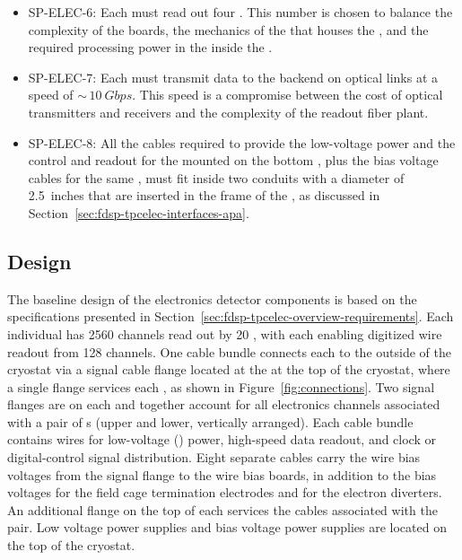 \begin{itemize}
\item SP-ELEC-6: Each  must read out four . This number
is chosen to balance the complexity of the boards, the mechanics
of the  that houses the , and the 
required processing power in the  inside the
.

\item SP-ELEC-7: Each  must transmit data to the 
backend on optical links at a speed of $\sim\,\SI{10}{Gbps}$. This speed 
is a compromise between the cost of optical transmitters and
receivers and the complexity of the readout fiber plant.

\item SP-ELEC-8: All the cables required to provide the low-voltage power
and the control and readout for the  mounted on
the bottom , plus the bias voltage cables for
the same , must fit inside two conduits with a
diameter of \SI{2.5}{inches} that are inserted in the frame of
the , as discussed in Section~\ref{sec:fdsp-tpcelec-interfaces-apa}. 
\end{itemize}

\subsection{Design}
\label{sec:fdsp-tpcelec-overview-design}

The baseline design of the  electronics detector components is
based on the specifications presented in Section~\ref{sec:fdsp-tpcelec-overview-requirements}. 
Each individual  has \num{2560} channels read out by \num{20} 
, with each  enabling digitized wire readout 
from \num{128} channels. One cable bundle connects each  to
the outside of the cryostat via a  signal cable flange located 
at the  \fdth at the top of the cryostat, where a single flange 
services each , as shown in Figure~\ref{fig:connections}. 
Two  signal flanges are on each \fdth and together account for 
all electronics channels associated with a pair of s (upper 
and lower, vertically arranged). Each cable bundle contains wires for 
low-voltage () power, high-speed data readout, and clock or 
digital-control signal distribution. Eight separate cables carry the 
 wire bias voltages from the signal flange to the  
wire bias boards, in addition to the bias voltages for the field cage 
termination electrodes and for the electron diverters. An additional 
flange on the top of each \fdth services the  cables associated 
with the  pair. Low voltage power supplies and bias voltage
power supplies are located on the top of the cryostat. 

